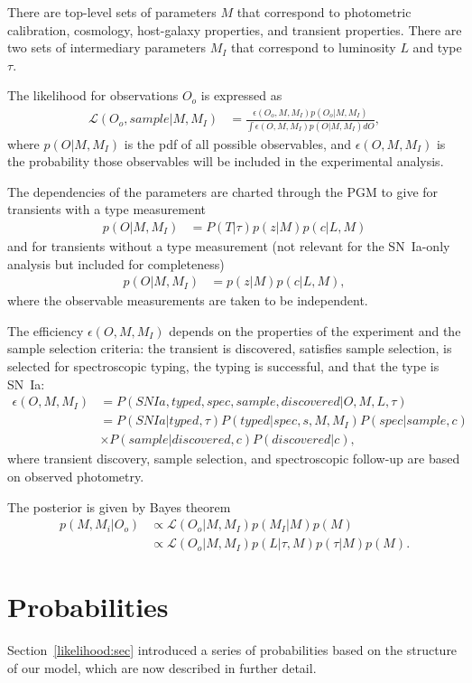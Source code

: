 \documentclass[preprint,3p]{elsarticle}
\begin{document}
There are top-level  sets of parameters $M$ that correspond to photometric calibration, cosmology,
host-galaxy properties, and transient properties.
There are two sets of intermediary parameters $M_I$ that correspond to luminosity $L$ and type $\tau$.

The likelihood for observations $O_o$ is expressed as
\begin{align*}
\mathcal{L}(O_o, sample| M, M_I) & = \frac{\epsilon(O_o, M, M_I) p(O_o|M, M_I)}{\int  \epsilon(O, M, M_I) p(O|M, M_I)dO},
\end{align*}
where $p(O|M, M_I)$ is the pdf of all possible observables, and $\epsilon(O, M, M_I) $
is the probability those observables will be included in the experimental analysis.

The dependencies of the parameters are charted through the PGM to give for transients with a type measurement
\begin{align*}
p(O| M, M_I) & = P(T | \tau) p(z | M) p(c | L, M)
\end{align*}
and for transients without a type measurement (not relevant for the SN~Ia-only analysis but included for completeness)
\begin{align*}
p(O| M, M_I) & = p(z | M) p(c | L, M),
\end{align*}
where the observable measurements are taken to be independent.

The efficiency $\epsilon(O, M, M_I) $ depends on the properties of the experiment and the sample selection criteria:
the transient is discovered, satisfies sample selection, is selected for spectroscopic typing, the typing
is successful, and that the type is SN~Ia:
\begin{align*}
\epsilon(O, M, M_I)  & = P(SNIa, typed, spec, sample, discovered |O, M, L, \tau)\\
& = P(SNIa|  typed, \tau)P(typed | spec, s, M, M_I)P(spec | sample, c) \\
& \times P(sample| discovered, c)P(discovered |c),
\end{align*}
where transient discovery, sample selection, and spectroscopic follow-up are based on observed photometry.

The posterior is given by Bayes theorem
\begin{align*}
p(M, M_i | O_o) & \propto \mathcal{L}(O_o| M, M_I) p(M_I|M) p(M)\\
 & \propto \mathcal{L}(O_o| M, M_I) p(L| \tau, M) p(\tau|M) p(M).
\end{align*}

\section{Probabilities}
Section~\ref{likelihood:sec} introduced a series of probabilities based on the structure of our model, which are now described
in further detail.
\end{document}
